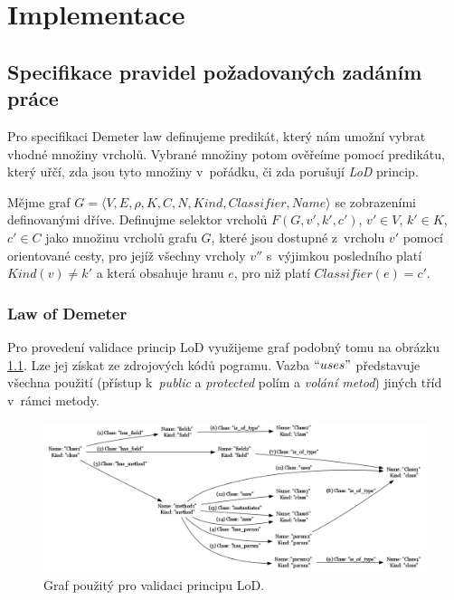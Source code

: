 \chapter{Implementace}

\section{Specifikace pravidel požadovaných zadáním práce}
Pro specifikaci Demeter law definujeme predikát, který nám umožní vybrat vhodné množiny vrcholů. Vybrané množiny potom ověřeíme pomocí predikátu, který uřčí, zda jsou tyto množiny v~pořádku, či zda porušují \emph{LoD} princip.

\begin{definition}
Mějme graf $G = \langle V, E, \rho, K, C, N, \mathit{Kind}, \mathit{Classifier}, \mathit{Name}\rangle$ se zobrazeními definovanými dříve. Definujme selektor vrcholů $F(G, v', k', c')$, $v' \in V$, $k' \in K$, $c' \in C$ jako množinu vrcholů grafu $G$, které jsou dostupné z~vrcholu $v'$ pomocí orientované cesty, pro jejíž všechny vrcholy $v''$ s~výjimkou posledního platí $Kind(v) \ne k'$ a která obsahuje hranu $e$, pro niž platí $Classifier(e) = c' $.
\end{definition}

\subsection{Law of Demeter}
Pro provedení validace princip LoD využijeme graf podobný tomu na obrázku \ref{implementation-lod_graph}. Lze jej získat ze zdrojových kódů pogramu. Vazba $``uses"$ představuje všechna použití (přístup k~\emph{public} a \emph{protected} polím a \emph{volání metod}) jiných tříd v~rámci metody.

\begin{figure}[h!]
  \centering
  \includegraphics[width=1.0\textwidth]{./graphs/demeter_graph.png}
  \caption{Graf použitý pro validaci principu LoD.\label{implementation-lod_graph}}
\end{figure}

